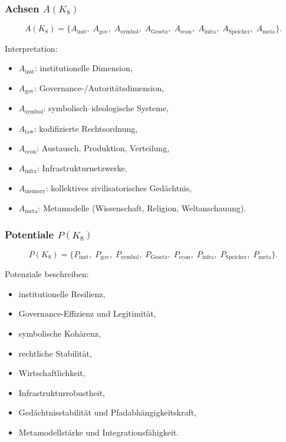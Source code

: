 \subsubsection{Achsen \texorpdfstring{$A(K_8)$}{A(K_8)}}

\[
A(K_8)=
\{
A_{\mathrm{inst}},\;
A_{\mathrm{gov}},\;
A_{\mathrm{symbol}},\;
A_{\mathrm{Gesetz}},\;
A_{\mathrm{econ}},\;
A_{\mathrm{infra}},\;
A_{\mathrm{Speicher}},\;
A_{\mathrm{meta}}
\}.
\]

Interpretation:
\begin{itemize}
    \item $A_{\mathrm{inst}}$: institutionelle Dimension,
    \item $A_{\mathrm{gov}}$: Governance-/Autoritätsdimension,
    \item $A_{\mathrm{symbol}}$: symbolisch–ideologische Systeme,
    \item $A_{\mathrm{law}}$: kodifizierte Rechtsordnung,
    \item $A_{\mathrm{econ}}$: Austausch, Produktion, Verteilung,
    \item $A_{\mathrm{infra}}$: Infrastrukturnetzwerke,
    \item $A_{\mathrm{memory}}$: kollektives zivilisatorisches Gedächtnis,
    \item $A_{\mathrm{meta}}$: Metamodelle (Wissenschaft, Religion, Weltanschauung).
\end{itemize}

\subsubsection{Potentiale \texorpdfstring{$P(K_8)$}{P(K_8)}}

\[
P(K_8)=
\{
P_{\mathrm{inst}},\;
P_{\mathrm{gov}},\;
P_{\mathrm{symbol}},\;
P_{\mathrm{Gesetz}},\;
P_{\mathrm{econ}},\;
P_{\mathrm{infra}},\;
P_{\mathrm{Speicher}},\;
P_{\mathrm{meta}}
\}.
\]

Potenziale beschreiben:
\begin{itemize}
    \item institutionelle Resilienz,
    \item Governance-Effizienz und Legitimität,
    \item symbolische Kohärenz,
    \item rechtliche Stabilität,
    \item Wirtschaftlichkeit,
    \item Infrastrukturrobustheit,
    \item Gedächtnisstabilität und Pfadabhängigkeitskraft,
    \item Metamodellstärke und Integrationsfähigkeit.
\end{itemize}

